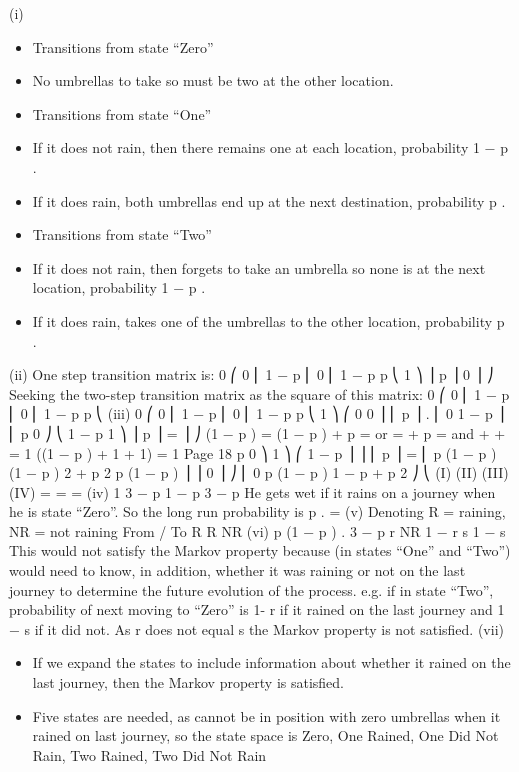 \documentclass[a4paper,12pt]{article}
\begin{document}
\begin{enumerate}
(i)
\begin{itemize}
\item Transitions from state “Zero”
\item No umbrellas to take so must be two at the other location.
\item Transitions from state “One”
\item If it does not rain, then there remains one at each location, probability 1 − p .
\item If it does rain, both umbrellas end up at the next destination, probability p .
\item Transitions from state “Two”
\item If it does not rain, then forgets to take an umbrella so none is at the next location,
probability 1 − p .
\item If it does rain, takes one of the umbrellas to the other location, probability p .
\end{itemize}
(ii)
One step transition matrix is:
0
⎛ 0
⎜
1 − p
⎜ 0
⎜ 1 − p
p
⎝
1 ⎞
⎟
p ⎟
0 ⎟ ⎠
Seeking the two-step transition matrix as the square of this matrix:
0
⎛ 0
⎜
1 − p
⎜ 0
⎜ 1 − p
p
⎝
(iii)
0
⎛ 0
⎜
1 − p
\pi ⎜ 0
⎜ 1 − p
p
⎝
1 ⎞ ⎛ 0
0
⎟ ⎜
p ⎟ . ⎜ 0
1 − p
⎟
⎜
p
0 ⎠ ⎝ 1 − p
1 ⎞
⎟
p ⎟ =  ⎟ ⎠
(1 − p )  = 
(1 − p )  + p  =  or  = 
 + p  = 
and
 +  +  = 1
((1 − p ) + 1 + 1)  = 1
Page 18
p
0
⎞
1 ⎞ ⎛ 1 − p
⎟
⎟ ⎜
p ⎟ = ⎜ p (1 − p ) (1 − p ) 2 + p 2
p (1 − p ) ⎟
⎟
0 ⎟ ⎠ ⎜ 0
p (1 − p )
1 − p + p 2 ⎠
⎝
(I)
(II)
(III)
(IV)%
 =  =
 =
(iv)
1
3 − p
1 − p
3 − p
He gets wet if it rains on a journey when he is state “Zero”.
So the long run probability is p .  =
(v)
Denoting R = raining, NR = not raining
From / To R
R
NR
(vi)
p (1 − p )
.
3 − p
r
NR
1 − r
s 1 − s
This would not satisfy the Markov property because (in states “One” and “Two”)
would need to know, in addition, whether it was raining or not on the last journey to
determine the future evolution of the process.
e.g. if in state “Two”, probability of next moving to “Zero” is 1- r if it rained on the
last journey and 1 − s if it did not. As r does not equal s the Markov property is not
satisfied.
(vii)
\begin{itemize}
\item If we expand the states to include information about whether it rained on the last
journey, then the Markov property is satisfied.
\item Five states are needed, as cannot be in position with zero umbrellas when it rained on
last journey,
so the state space is {Zero, One Rained, One Did Not Rain, Two Rained, Two Did
Not Rain}
\end{itemize}


\end{enumerate}
\end{document}
